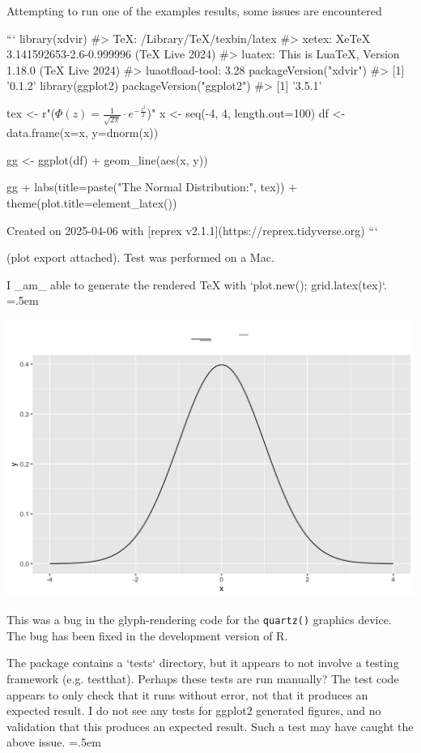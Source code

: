 \documentclass{article}
\newcommand{\code}[1]{\texttt{#1}}
\newenvironment{lcverbatim}
 {\SaveVerbatim{cverb}}
 {\endSaveVerbatim
  \flushleft\fboxrule=0pt\fboxsep=.5em
  \colorbox{cverbbg}{%
    \makebox[\dimexpr\linewidth-2\fboxsep][l]{\BUseVerbatim{cverb}}%
  }
  \endflushleft
}
\begin{document}
\begin{lcverbatim}
  Attempting to run one of the examples results, some issues are encountered

  ```
  library(xdvir)
  #>             TeX:  /Library/TeX/texbin/latex
  #>           xetex:  XeTeX 3.141592653-2.6-0.999996 (TeX Live 2024)
  #>          luatex:  This is LuaTeX, Version 1.18.0 (TeX Live 2024)
  #> luaotfload-tool:  3.28
  packageVersion("xdvir")
  #> [1] '0.1.2'
  library(ggplot2)
  packageVersion("ggplot2")
  #> [1] '3.5.1'

  tex <- r"(\huge $\Phi(z) = \frac{1}{\sqrt{2\pi}} \cdot e^{-\frac{z^2}{2}}$)"
  x <- seq(-4, 4, length.out=100)
  df <- data.frame(x=x, y=dnorm(x))

  gg <- ggplot(df) + geom_line(aes(x, y))

  gg +
    labs(title=paste("The Normal Distribution:", tex)) +
    theme(plot.title=element_latex())

  Created on 2025-04-06 with [reprex v2.1.1](https://reprex.tidyverse.org)
  ```

  (plot export attached). Test was performed on a Mac.
  
  I _am_ able to generate the rendered TeX with `plot.new(); grid.latex(tex)`.
\end{lcverbatim}

\includegraphics[width=\textwidth]{plot_issue.png}

This was a bug in the glyph-rendering code for the \code{quartz()} graphics 
device.  The bug has been fixed in the development version of R.

\begin{lcverbatim}
  The package contains a `tests` directory, but it appears to not involve a 
  testing framework (e.g. {testthat}). Perhaps these tests are run manually? 
  The test code appears to only check that it runs without error, not that it 
  produces an expected result. I do not see any tests for {ggplot2} generated 
  figures, and no validation that this produces an expected result. Such a test
  may have caught the above issue.
\end{lcverbatim}
\end{document}
